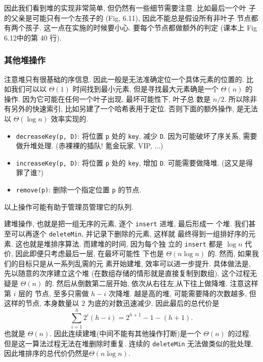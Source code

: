 \documentclass[a4paper]{ctexart}
\theoremstyle{definition}
\theoremstyle{definition}
\begin{document}
因此我们看到堆的实现非常简单, 但仍然有一些细节需要注意. 比如最后一个叶
子的父亲是可能只有一个左孩子的 (Fig, 6.11), 因此不能总是假设所有非叶子
节点都有两个孩子. 这一点在实施的时候要小心. 要每个节点都做额外的判定
(课本上 Fig 6.12中的第 40 行). 

\subsubsection{其他堆操作}

注意堆只有很基础的序信息. 因此一般是无法准确定位一个具体元素的位置的.
比如我们可以以 $\Theta(1)$ 时间找到最小元素, 但是寻找最大元素确是一个
$\Theta(n)$ 的操作. 因为它可能在任何一个叶子出现, 最坏可能性下, 叶子总
数是 $n / 2$. 所以除非有另外的快速索引, 比如另建了一个哈希表用于定位.
否则下面的额外操作, 是无法以 $\Theta(\log n)$ 效率实现的.

\begin{itemize}
\item \verb|decreaseKey(p, D)|: 将位置 \verb|p| 处的 \verb|key|, 减少
  \verb|D|. 因为可能破坏了序关系, 需要做升堆处理. (赤裸裸的插队! 氪金玩家, VIP, ...)

\item \verb|increaseKey(p, D)|: 将位置 \verb|p| 处的 \verb|key|, 增加
  \verb|D|. 可能需要做降堆. (这又是得罪了谁?)

\item \verb|remove(p)|: 删除一个指定位置 \verb|p| 的节点.
\end{itemize}
以上操作可能有助于管理员管理它的队列.


建堆操作, 也就是把一组无序的元素, 逐个 \verb|insert| 进堆, 最后形成一
个堆. 我们甚至可以再逐个 \verb|deleteMin|, 并记录下删除的元素, 这样就
最终得到一组排好序的元素. 这也就是堆排序算法. 而建堆的时间, 因为每个独
立的 \verb|insert| 都是 $\log n$ 代价, 因此即便只考虑最后一层, 在最坏可能性
下也是 $\Theta(n \log n)$ 的. 然而, 如果我们的目标只是从一系列乱需的元
素开始建堆, 效率可以进一步提升. 具体做法是, 先以随意的次序建立这个堆
(在数组存储的情形就是直接复制到数组), 这个过程无疑是 $\Theta(n)$ 的.
然后从倒数第二层开始, 依次从右往左,从下往上做降堆. 注意这样第 $i$ 层的
节点, 至多只需做 $h - i$ 次降堆. 越是高的堆, 可能需要降的次数越多, 但
这样的节点, 本身数量以 $2$ 为底的对数迅速减少. 因此最后的总代价是
$$ 
\sum_{i = 1}^h 2^i(h - i) =
2^{h + 1} - 1 - (h + 1).
$$
也就是 $\Theta(n)$. 因此连续建堆(中间不能有其他操作打断)是一个
$\Theta(n)$ 的过程. 但是这一算法过程无法在堆删除时重复. 连续的
\verb|deleteMin| 无法做类似的批处理, 因此堆排序的总代价仍然是$\Theta(n
\log n)$.
\end{document}
